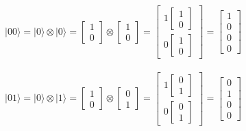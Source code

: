 \documentclass[11pt, fleqn]{article}
\begin{document}
$|00\rangle=|0\rangle \otimes |0\rangle=
\begin{bmatrix}1\\0 \end{bmatrix}\otimes
\begin{bmatrix}1\\0 \end{bmatrix}=
\begin{bmatrix}1\begin{bmatrix}1\\0 \end{bmatrix}\\0\begin{bmatrix}1\\0 \end{bmatrix}\end{bmatrix}=
\begin{bmatrix}1\\0\\0\\0 \end{bmatrix}$
\\~\\

$|01\rangle=|0\rangle \otimes |1\rangle=
\begin{bmatrix}1\\0 \end{bmatrix}\otimes
\begin{bmatrix}0\\1 \end{bmatrix}=
\begin{bmatrix}1\begin{bmatrix}0\\1 \end{bmatrix}\\0\begin{bmatrix}0\\1 \end{bmatrix}\end{bmatrix}=
\begin{bmatrix}0\\1\\0\\0 \end{bmatrix}$
\\~\\
\end{document}
